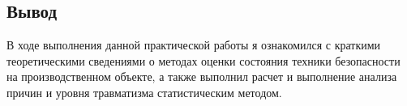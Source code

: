 \documentclass[a5paper, 12dd, twoside]{article}
\begin{document}
\subsection*{Вывод}
В ходе выполнения данной практической работы я ознакомился с краткими теоретическими сведениями о методах оценки состояния техники безопасности на производственном объекте, а также выполнил расчет и выполнение анализа причин и уровня травматизма статистическим методом.
\end{document}
